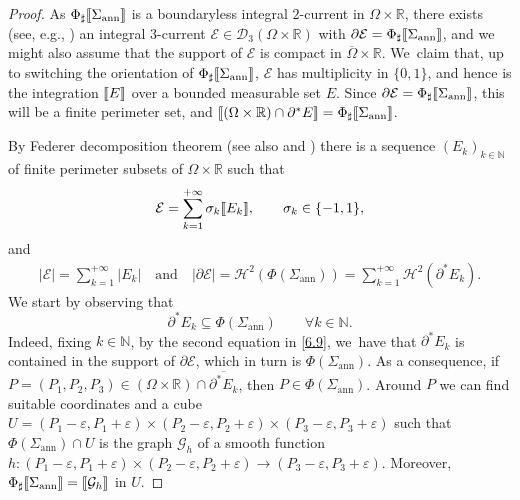 \documentclass[JEP,XML,SOM,Unicode, NoFloatCountersInSection,published]{cedram}
\newcommand{\R}{\mathbb{R}}
\let\eps\varepsilon
\let\Om\Omega
\newcommand{\jump}[1]{\textup{\textlbrackdbl}{#1}\textup{\textrbrackdbl}}
\newcommand{\openannulus}{\Sigma_\mathrm{ann}}
\theoremstyle{definition}
\begin{document}
\begin{proof}
As $\Phi_\sharp\jump{\openannulus}$ is a boundaryless integral $2$-current in $\Omega\times\R$, there exists (see, e.g., \cite[Th.\,7.9.1]{Krantz-Parks}) an integral $3$-current $\mathcal E\in \mathcal D_3(\Omega\times\R)$ with $\partial\mathcal E=\Phi_\sharp\jump{\openannulus}$, and we might also assume that the support of $\mathcal E$ is compact in $\overline\Omega\times\R$. We~claim that, up to switching the orientation of $\Phi_\sharp\jump{\openannulus}$, $\mathcal E$ has multiplicity in $\{0,1\}$, and hence is the integration $\jump{E}$ over a bounded measurable set $E$.
Since $\partial\mathcal E=\Phi_\sharp\jump{\openannulus}$, this will be a
finite perimeter set, and $\jump{(\Om\times\R)\cap\partial^*E}=\Phi_\sharp\jump{\openannulus}$.

By Federer decomposition theorem \cite[\S 4.2.25, p.\,420]{Federer} (see also \cite[\S 4.5.9]{Federer} and \cite[Th.\,7.5.5]{Krantz-Parks}) there is a sequence
$(E_k)_{k\in \mathbb N}$ of finite perimeter subsets of $\Om\times\R$ such that
\begin{equation}\label{6.9a}
\mathcal E=\sum_{k=1}^{+\infty}\sigma_k\jump{E_k},\qquad \sigma_k\in \{-1,1\},
\end{equation}
and
\begin{align}\label{6.9}
|\mathcal E|=\sum_{k=1}^{+\infty}|E_k|\quad\text{and} \quad|\partial\mathcal E|=\mathcal H^2(\Phi(\openannulus))=\sum_{k=1}^{+\infty}\mathcal H^2(\partial^*E_k).
\end{align}
We start by observing that
\begin{equation}\label{inclusione}
\partial^*E_k\subseteq \Phi(\openannulus)\qquad \forall k\in \mathbb N.
\end{equation}
Indeed, fixing $k\in \mathbb N$, by the second equation in \eqref{6.9}, we~have that $\partial^*E_k$ is contained in the support of $\partial\mathcal E$, which in turn is $\Phi(\openannulus)$.
As a consequence, if $P=(P_1,P_2,P_3)\in(\Om\times\R)\cap \overline{\partial^*E_k}$, then $P\in \Phi(\openannulus)$. Around $P$ we can find suitable coordinates and a cube $U=(P_1-\eps,P_1+\eps)\times (P_2-\eps,P_2+\eps)\times(P_3-\eps,P_3+\eps)$ such that $\Phi(\openannulus)\cap U$ is the graph $\mathcal G_h$ of a smooth function $h:(P_1-\eps,P_1+\eps)\times (P_2-\eps,P_2+\eps)\to (P_3-\eps,P_3+\eps)$. Moreover, $\Phi_\sharp\jump{\openannulus}=\jump{\mathcal G_h}$ in $U$.


\end{proof}
\end{document}

